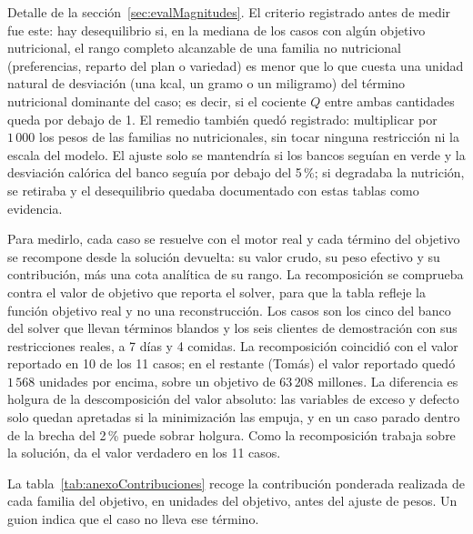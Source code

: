Detalle de la sección~\ref{sec:evalMagnitudes}. El criterio registrado antes de medir fue este: hay desequilibrio si, en la mediana de los casos con algún objetivo nutricional, el rango completo alcanzable de una familia no nutricional (preferencias, reparto del plan o variedad) es menor que lo que cuesta una unidad natural de desviación (una kcal, un gramo o un miligramo) del término nutricional dominante del caso; es decir, si el cociente $Q$ entre ambas cantidades queda por debajo de 1. El remedio también quedó registrado: multiplicar por $1\,000$ los pesos de las familias no nutricionales, sin tocar ninguna restricción ni la escala del modelo. El ajuste solo se mantendría si los bancos seguían en verde y la desviación calórica del banco seguía por debajo del 5\,\%; si degradaba la nutrición, se retiraba y el desequilibrio quedaba documentado con estas tablas como evidencia.

Para medirlo, cada caso se resuelve con el motor real y cada término del objetivo se recompone desde la solución devuelta: su valor crudo, su peso efectivo y su contribución, más una cota analítica de su rango. La recomposición se comprueba contra el valor de objetivo que reporta el solver, para que la tabla refleje la función objetivo real y no una reconstrucción. Los casos son los cinco del banco del solver que llevan términos blandos y los seis clientes de demostración con sus restricciones reales, a 7 días y 4 comidas. La recomposición coincidió con el valor reportado en 10 de los 11 casos; en el restante (Tomás) el valor reportado quedó $1\,568$ unidades por encima, sobre un objetivo de $63\,208$ millones. La diferencia es holgura de la descomposición del valor absoluto: las variables de exceso y defecto solo quedan apretadas si la minimización las empuja, y en un caso parado dentro de la brecha del 2\,\% puede sobrar holgura. Como la recomposición trabaja sobre la solución, da el valor verdadero en los 11 casos.

La tabla~\ref{tab:anexoContribuciones} recoge la contribución ponderada realizada de cada familia del objetivo, en unidades del objetivo, antes del ajuste de pesos. Un guion indica que el caso no lleva ese término.

